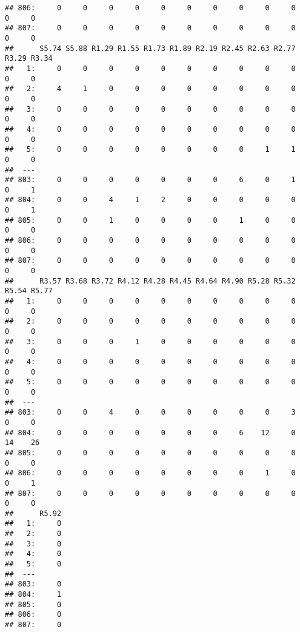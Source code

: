 \documentclass[
]{article}
\begin{document}
\begin{verbatim}
## 806:     0     0     0     0     0     0     0     0     0     0     0     0
## 807:     0     0     0     0     0     0     0     0     0     0     0     0
##      S5.74 S5.88 R1.29 R1.55 R1.73 R1.89 R2.19 R2.45 R2.63 R2.77 R3.29 R3.34
##   1:     0     0     0     0     0     0     0     0     0     0     0     0
##   2:     4     1     0     0     0     0     0     0     0     0     0     0
##   3:     0     0     0     0     0     0     0     0     0     0     0     0
##   4:     0     0     0     0     0     0     0     0     0     0     0     0
##   5:     0     0     0     0     0     0     0     0     1     1     0     0
##  ---                                                                        
## 803:     0     0     0     0     0     0     0     6     0     1     0     1
## 804:     0     0     4     1     2     0     0     0     0     0     0     1
## 805:     0     0     1     0     0     0     0     1     0     0     0     0
## 806:     0     0     0     0     0     0     0     0     0     0     0     0
## 807:     0     0     0     0     0     0     0     0     0     0     0     0
##      R3.57 R3.68 R3.72 R4.12 R4.28 R4.45 R4.64 R4.90 R5.28 R5.32 R5.54 R5.77
##   1:     0     0     0     0     0     0     0     0     0     0     0     0
##   2:     0     0     0     0     0     0     0     0     0     0     0     0
##   3:     0     0     0     1     0     0     0     0     0     0     0     0
##   4:     0     0     0     0     0     0     0     0     0     0     0     0
##   5:     0     0     0     0     0     0     0     0     0     0     0     0
##  ---                                                                        
## 803:     0     0     4     0     0     0     0     0     0     3     0     0
## 804:     0     0     0     0     0     0     0     6    12     0    14    26
## 805:     0     0     0     0     0     0     0     0     0     0     0     0
## 806:     0     0     0     0     0     0     0     0     1     0     0     1
## 807:     0     0     0     0     0     0     0     0     0     0     0     0
##      R5.92
##   1:     0
##   2:     0
##   3:     0
##   4:     0
##   5:     0
##  ---      
## 803:     0
## 804:     1
## 805:     0
## 806:     0
## 807:     0
\end{verbatim}
\end{document}

